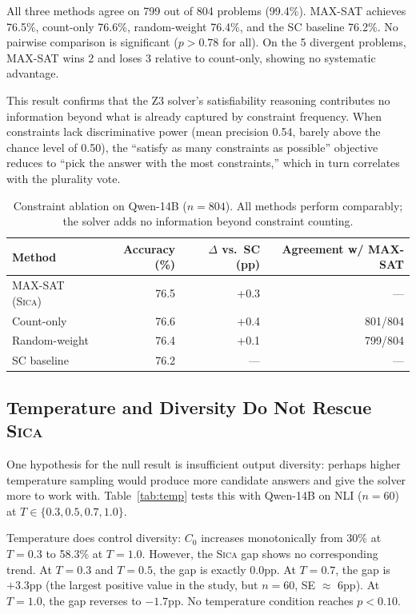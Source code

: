 \documentclass[11pt,a4paper]{article}
\newcommand{\sica}{\textsc{Sica}}
\newcommand{\czero}{C_0}
\begin{document}
All three methods agree on 799 out of 804 problems (99.4\%). MAX-SAT achieves 76.5\%, count-only 76.6\%, random-weight 76.4\%, and the SC baseline 76.2\%. No pairwise comparison is significant ($p > 0.78$ for all). On the 5 divergent problems, MAX-SAT wins 2 and loses 3 relative to count-only, showing no systematic advantage.

This result confirms that the Z3 solver's satisfiability reasoning contributes no information beyond what is already captured by constraint frequency. When constraints lack discriminative power (mean precision 0.54, barely above the chance level of 0.50), the ``satisfy as many constraints as possible'' objective reduces to ``pick the answer with the most constraints,'' which in turn correlates with the plurality vote.

\begin{table}[t]
\centering
\caption{Constraint ablation on Qwen-14B ($n = 804$). All methods perform comparably; the solver adds no information beyond constraint counting.}
\label{tab:ablation}
\small
\begin{tabular}{lrrr}
\toprule
\textbf{Method} & \textbf{Accuracy (\%)} & \textbf{$\Delta$ vs.\ SC (pp)} & \textbf{Agreement w/ MAX-SAT} \\
\midrule
MAX-SAT (\sica{}) & 76.5 & +0.3 & --- \\
Count-only & 76.6 & +0.4 & 801/804 \\
Random-weight & 76.4 & +0.1 & 799/804 \\
SC baseline & 76.2 & --- & --- \\
\bottomrule
\end{tabular}
\end{table}

\subsection{Temperature and Diversity Do Not Rescue \sica{}}

One hypothesis for the null result is insufficient output diversity: perhaps higher temperature sampling would produce more candidate answers and give the solver more to work with. Table~\ref{tab:temp} tests this with Qwen-14B on NLI ($n = 60$) at $T \in \{0.3, 0.5, 0.7, 1.0\}$.

Temperature does control diversity: $\czero$ increases monotonically from 30\% at $T = 0.3$ to 58.3\% at $T = 1.0$. However, the \sica{} gap shows no corresponding trend. At $T = 0.3$ and $T = 0.5$, the gap is exactly 0.0pp. At $T = 0.7$, the gap is $+3.3$pp (the largest positive value in the study, but $n = 60$, SE $\approx$ 6pp). At $T = 1.0$, the gap reverses to $-1.7$pp. No temperature condition reaches $p < 0.10$.
\end{document}

